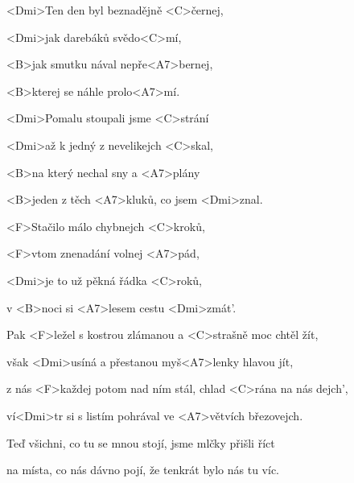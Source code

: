 

\zs
<Dmi>Ten den byl beznadějně <C>černej,

<Dmi>jak darebáků svědo<C>mí,

<B>jak smutku nával nepře<A7>bernej,

<B>kterej se náhle prolo<A7>mí.

<Dmi>Pomalu stoupali jsme <C>strání

<Dmi>až k jedný z nevelikejch <C>skal,

<B>na který nechal sny a <A7>plány

<B>jeden z těch <A7>kluků, co jsem <Dmi>znal.
\ks

\zr
<F>Stačilo málo chybnejch <C>kroků,

<F>vtom znenadání volnej <A7>pád,

<Dmi>je to už pěkná řádka <C>roků,

v <B>noci si <A7>lesem cestu <Dmi>zmát'.

Pak <F>ležel s kostrou zlámanou a <C>strašně moc chtěl žít,

však <Dmi>usíná a přestanou myš<A7>lenky hlavou jít,

z nás <F>každej potom nad ním stál, chlad <C>rána na nás dejch',

ví<Dmi>tr si s listím pohrával ve <A7>větvích březovejch.
\kr

\zs
Teď všichni, co tu se mnou stojí, jsme mlčky  přišli říct

na místa, co nás dávno pojí, že tenkrát bylo nás tu víc.
\ks

\kp
